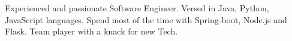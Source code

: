 
\par{
Experienced and passionate Software Engineer. Versed in Java, Python, JavaScript languages. Spend most of the time with Spring-boot, Node.js and Flask. Team player with a knack for new Tech. 
}\\